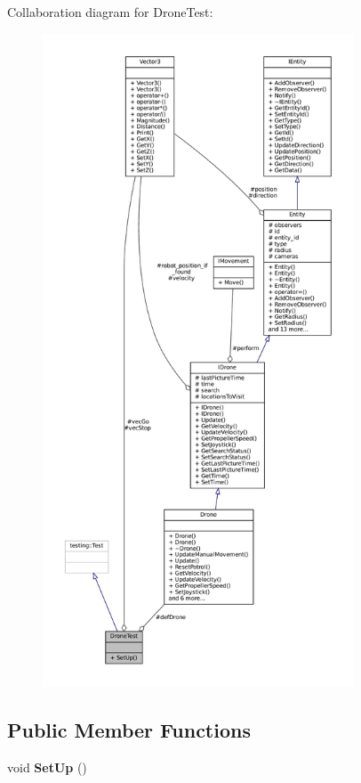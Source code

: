 Collaboration diagram for Drone\+Test\+:
\nopagebreak
\begin{figure}[H]
\begin{center}
\leavevmode
\includegraphics[height=550pt]{classDroneTest__coll__graph}
\end{center}
\end{figure}
\subsection*{Public Member Functions}
\begin{DoxyCompactItemize}
\item 
\mbox{\label{classDroneTest_a2ccc60ee4fb92e3c6491afa2ff62b63c}} 
void {\bfseries Set\+Up} ()
\end{DoxyCompactItemize}
